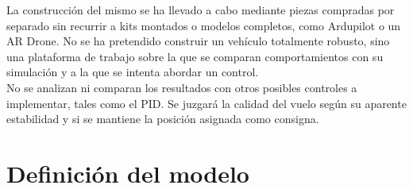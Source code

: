 \documentclass[twoside,11pt]{book}
\begin{document}
La construcción del mismo se ha llevado a cabo mediante piezas compradas por separado sin recurrir a kits montados o modelos completos, como Ardupilot o un AR Drone. No se ha pretendido construir un vehículo totalmente robusto, sino una plataforma de trabajo sobre la que se comparan comportamientos con su simulación y a la que se intenta abordar un control.\\  

No se analizan ni comparan los resultados con otros posibles controles a implementar, tales como el PID. Se juzgará la calidad del vuelo según su aparente estabilidad y si se mantiene la posición asignada como consigna. 





\newpage
\chapter{Definición del modelo} \label{def}
\end{document}
